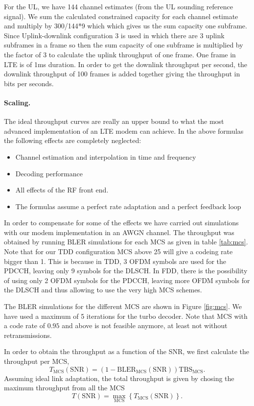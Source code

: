 \documentclass[a4paper,10pt]{article}
\begin{document}
For the UL, we have 144 channel estimates (from the UL sounding reference signal). We sum the calculated constrained capacity for each channel estimate and multiply by 300/144*9 which which gives us the sum capacity one subframe. Since Uplink-downlink configuration 3 is used in which there are 3 uplink subframes in a frame so then the sum capacity of one subframe is multiplied by the factor of 3 to calculate the uplink throughput of one frame. One frame in LTE is of 1ms duration. In order to get the downlink throughput per second, the downlink throughput of 100 frames is added together giving the throughput in bits per seconds. 

\paragraph{Scaling.}
The ideal throughput curves are really an upper bound to what the most advanced implementation of an LTE modem can achieve. In the above formulas the following effects are completely neglected:
\begin{itemize}
 \item Channel estimation and interpolation in time and frequency
 \item Decoding performance
 \item All effects of the RF front end.
 \item The formulas assume a perfect rate adaptation and a perfect feedback loop
\end{itemize}

In order to compensate for some of the effects we have carried out simulations with our modem implementation in an AWGN channel. The throughput was obtained by running BLER simulations for each MCS as given in table \ref{tab:mcs}. Note that for our TDD configuration MCS above 25 will give a codeing rate bigger than 1. This is because in TDD, 3 OFDM symbols are used for the PDCCH, leaving only 9 symbols for the DLSCH. In FDD, there is the possibility of using only 2 OFDM symbols for the PDCCH, leaving more OFDM symbols for the DLSCH and thus allowing to use the very high MCS schemes.

The BLER simulations for the different MCS are shown in Figure \ref{fig:mcs}. We have used a maximum of 5 iterations for the turbo decoder. Note that MCS with a code rate of $0.95$ and above is not feasible anymore, at least not without retransmissions. 

In order to obtain the throughput as a function of the SNR, we first calculate the throughput per MCS, 
\begin{equation}
 T_{\mathrm{MCS}}(\mathrm{SNR}) = (1-\mathrm{BLER}_{\mathrm{MCS}}(\mathrm{SNR})) \mathrm{TBS}_{\mathrm{MCS}}.
\end{equation}
Assuming ideal link adaptation, the total throughput is given by chosing the maximum throughput from all the MCS 
\begin{equation}
T(\mathrm{SNR}) = \max_{\mathrm{MCS}} \left\{ T_{\mathrm{MCS}}(\mathrm{SNR}) \right\}. 
\label{eq:tp_sim}
\end{equation}
\end{document}
